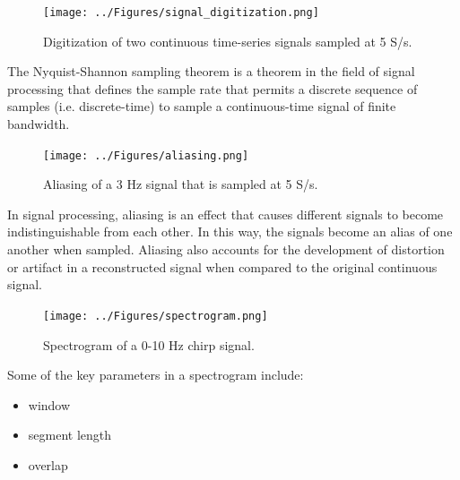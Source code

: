 \documentclass[12pt,letter]{article}
\numberwithin{ex}{section} %
\numberwithin{re}{section} %
\begin{document}
\begin{figure}[H]
    \centering
    \texttt{[image: ../Figures/signal\_digitization.png]}
    \caption{Digitization of two continuous time-series signals sampled at 5 S/s.}
    \label{fig:signal_digitization}
\end{figure}


The Nyquist-Shannon sampling theorem is a theorem in the field of signal processing that defines the sample rate that permits a discrete sequence of samples (i.e. discrete-time) to sample a continuous-time signal of finite bandwidth. 

\begin{figure}[H]
    \centering
    \texttt{[image: ../Figures/aliasing.png]}
    \caption{Aliasing of a 3 Hz signal that is sampled at 5 S/s.}
    \label{fig:aliasing}
\end{figure}

In signal processing, aliasing is an effect that causes different signals to become indistinguishable from each other.  In this way, the signals become an alias of one another when sampled. Aliasing also accounts for the development of distortion or artifact in a reconstructed signal when compared to the original continuous signal.


\begin{figure}[H]
    \centering
    \texttt{[image: ../Figures/spectrogram.png]}
    \caption{Spectrogram of a 0-10 Hz chirp signal.}
    \label{fig:spectrogram}
\end{figure}

Some of the key parameters in a spectrogram include:

\begin{itemize}
\item window
\item segment length
\item overlap
\end{itemize}
\end{document}
